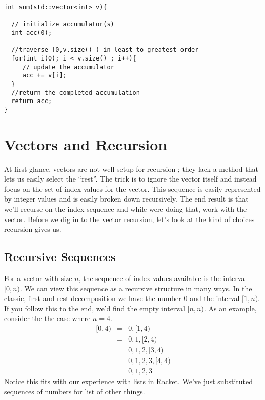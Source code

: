 \documentclass[]{tufte-handout}
\begin{document}
\begin{verbatim}
int sum(std::vector<int> v){

  // initialize accumulator(s)
  int acc(0);
  
  //traverse [0,v.size() ) in least to greatest order
  for(int i(0); i < v.size() ; i++){
     // update the accumulator
     acc += v[i];
  }
  //return the completed accumulation
  return acc;
}
\end{verbatim}
	
\section{Vectors and Recursion}

At first glance, vectors are not well setup for recursion	; they lack a method that lets us easily select the ``rest''. The trick is to ignore the vector itself and instead focus on the set of index values for the vector. This sequence is easily represented by integer values and is easily broken down recursively. The end result is that we'll recurse on the index sequence and while were doing that, work with the vector.  Before we dig in to the vector recursion, let's look at the kind of choices recursion gives us.

\subsection{Recursive Sequences}
   
For a vector with size $n$, the sequence of index values available is the interval $[0,n)$.  We can view this sequence as a recursive structure in many ways.  In the classic, first and rest decomposition we have the number $0$ and the interval $[1,n)$.  If you follow this to the end, we'd find the empty interval $[n,n)$. As an example, consider the the case where $n=4$.
\begin{equation*}
\begin{array}{rcl}
[0,4) &=& 0,[1,4) \\
 &=& 0,1,[2,4) \\
 &=& 0,1,2,[3,4) \\
 &=& 0,1,2,3,[4,4) \\
 &=& 0,1,2,3 
\end{array}
\end{equation*}
Notice this fits with our experience with lists in Racket. We've just substituted sequences of numbers for list of other things.
\end{document}
